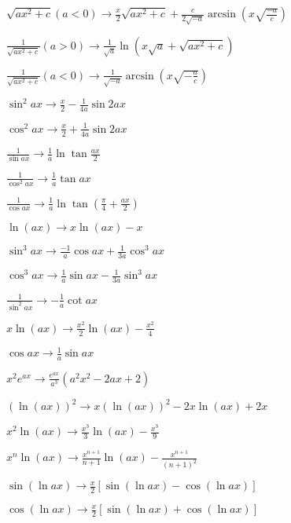 $\sqrt{ax^2+c}(a<0) \to \frac{x}{2}\sqrt{ax^2+c}+\frac{c}{2\sqrt{-a}}\arcsin(x\sqrt{\frac{-a}{c}})$\par
$\frac{1}{\sqrt{ax^2+c}}(a>0) \to \frac{1}{\sqrt{a}}\ln(x\sqrt{a}+\sqrt{ax^2+c})$\par
$\frac{1}{\sqrt{ax^2+c}}(a<0) \to \frac{1}{\sqrt{-a}}\arcsin(x\sqrt{-\frac{a}{c}})$\par
$\sin^2 ax \to \frac{x}{2}-\frac{1}{4a}\sin 2ax$\par
$\cos^2 ax \to \frac{x}{2}+\frac{1}{4a}\sin 2ax$\par
$\frac{1}{\sin ax} \to \frac{1}{a}\ln\tan\frac{ax}{2}$\par
$\frac{1}{\cos^2 ax} \to \frac{1}{a}\tan ax$\par
$\frac{1}{\cos ax} \to \frac{1}{a}\ln \tan(\frac{\pi}{4}+\frac{ax}{2})$\par
$\ln(ax)\to x\ln(ax)-x$\par
$\sin^3 ax \to \frac{-1}{a}\cos ax+\frac{1}{3a}\cos^3 ax$\par
$\cos^3 ax \to \frac{1}{a}\sin ax - \frac{1}{3a}\sin^3 ax$\par
$\frac{1}{\sin^2 ax}\to -\frac{1}{a}\cot ax$\par
$x\ln(ax)\to \frac{x^2}{2}\ln(ax)-\frac{x^2}{4}$\par
$\cos ax\to \frac{1}{a}\sin ax$\par
$x^2 e^{ax} \to \frac{e^{ax}}{a^3}(a^2x^2-2ax+2)$\par
$(\ln(ax))^2 \to x(\ln(ax))^2-2x\ln(ax)+2x$\par
$x^2\ln(ax) \to \frac{x^3}{3}\ln(ax)-\frac{x^3}{9}$\par
$x^n\ln(ax) \to \frac{x^{n+1}}{n+1}\ln(ax)-\frac{x^{n+1}}{(n+1)^2}$\par
$\sin(\ln ax) \to \frac{x}{2}[\sin(\ln ax) - \cos(\ln ax)]$\par
$\cos(\ln ax) \to \frac{x}{2}[\sin(\ln ax) + \cos(\ln ax)]$\par
